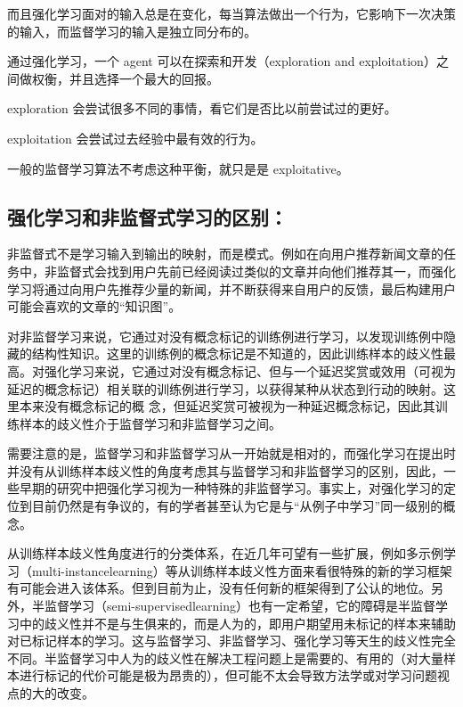 而且强化学习面对的输入总是在变化，每当算法做出一个行为，它影响下一次决策的输入，而监督学习的输入是独立同分布的。

通过强化学习，一个 agent 可以在探索和开发（exploration and
exploitation）之间做权衡，并且选择一个最大的回报。

exploration 会尝试很多不同的事情，看它们是否比以前尝试过的更好。

exploitation 会尝试过去经验中最有效的行为。

一般的监督学习算法不考虑这种平衡，就只是是 exploitative。

\subsection{强化学习和非监督式学习的区别：}\label{ux5f3aux5316ux5b66ux4e60ux548cux975eux76d1ux7763ux5f0fux5b66ux4e60ux7684ux533aux522b}

非监督式不是学习输入到输出的映射，而是模式。例如在向用户推荐新闻文章的任务中，非监督式会找到用户先前已经阅读过类似的文章并向他们推荐其一，而强化学习将通过向用户先推荐少量的新闻，并不断获得来自用户的反馈，最后构建用户可能会喜欢的文章的``知识图''。

对非监督学习来说，它通过对没有概念标记的训练例进行学习，以发现训练例中隐藏的结构性知识。这里的训练例的概念标记是不知道的，因此训练样本的歧义性最高。对强化学习来说，它通过对没有概念标记、但与一个延迟奖赏或效用（可视为延迟的概念标记）相关联的训练例进行学习，以获得某种从状态到行动的映射。这里本来没有概念标记的概
念，但延迟奖赏可被视为一种延迟概念标记，因此其训练样本的歧义性介于监督学习和非监督学习之间。

需要注意的是，监督学习和非监督学习从一开始就是相对的，而强化学习在提出时并没有从训练样本歧义性的角度考虑其与监督学习和非监督学习的区别，因此，一些早期的研究中把强化学习视为一种特殊的非监督学习。事实上，对强化学习的定位到目前仍然是有争议的，有的学者甚至认为它是与``从例子中学习''同一级别的概念。

从训练样本歧义性角度进行的分类体系，在近几年可望有一些扩展，例如多示例学习（multi-instancelearning）等从训练样本歧义性方面来看很特殊的新的学习框架有可能会进入该体系。但到目前为止，没有任何新的框架得到了公认的地位。另外，半监督学习（semi-supervisedlearning）也有一定希望，它的障碍是半监督学习中的歧义性并不是与生俱来的，而是人为的，即用户期望用未标记的样本来辅助对已标记样本的学习。这与监督学习、非监督学习、强化学习等天生的歧义性完全不同。半监督学习中人为的歧义性在解决工程问题上是需要的、有用的（对大量样本进行标记的代价可能是极为昂贵的），但可能不太会导致方法学或对学习问题视点的大的改变。

